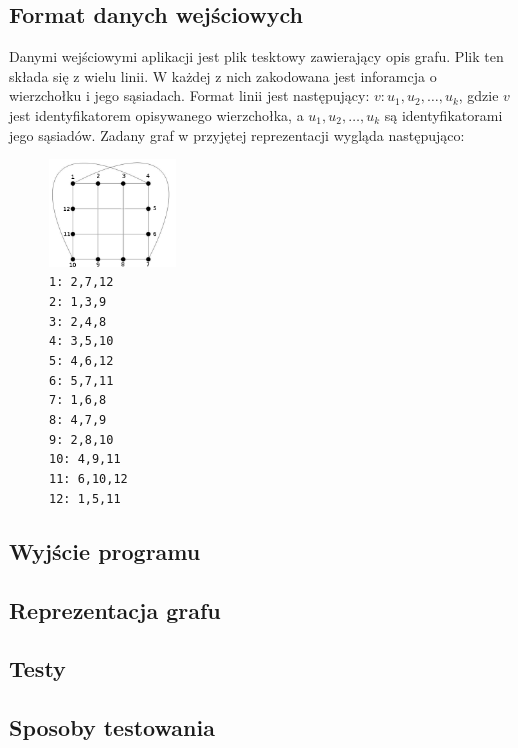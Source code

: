 \documentclass[a4 122pt]{article}
\begin{document}
	\subsection{Format danych wejściowych} \label{sec:format}
		Danymi wejściowymi aplikacji jest plik tesktowy zawierający opis grafu. Plik ten składa się z wielu linii. W każdej z nich zakodowana jest inforamcja o wierzchołku i jego sąsiadach. Format linii jest następujący:
		$v: u_1, u_2, \dots , u_k$, gdzie $v$ jest identyfikatorem opisywanego wierzchołka, a $u_1, u_2, \dots , u_k$ są identyfikatorami jego sąsiadów.
		Zadany graf w przyjętej reprezentacji wygląda następująco:
		\begin{figure}
			\centering
			\includegraphics[width=0.3\textwidth]{include/graf.png}
			\caption*
{
\texttt{1: 2,7,12\\
2: 1,3,9\\
3: 2,4,8\\
4: 3,5,10\\
5: 4,6,12\\
6: 5,7,11\\
7: 1,6,8\\
8: 4,7,9\\
9: 2,8,10\\
10: 4,9,11\\
11: 6,10,12\\
12: 1,5,11}}
		\end{figure}
	\subsection{Wyjście programu}

	\subsection{Reprezentacja grafu}

\subsection{Testy}

	\subsection{Sposoby testowania}
\end{document}
